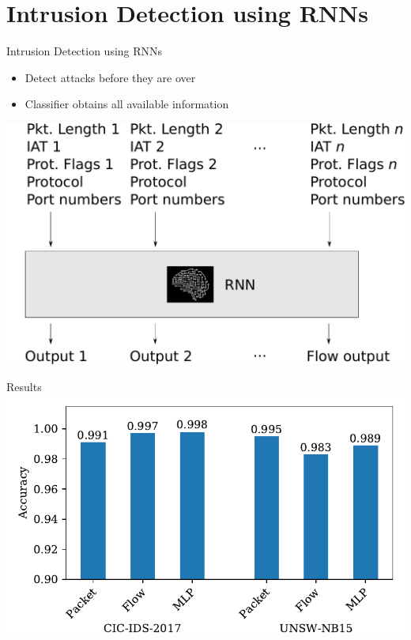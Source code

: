 \documentclass{beamer}
\begin{document}
\section{Intrusion Detection using RNNs}
\begin{frame}{Intrusion Detection using RNNs}
\begin{itemize}
\item Detect attacks before they are over
\item Classifier obtains all available information
\end{itemize}
\vspace{10pt}
\centering
\includegraphics[width=0.7\columnwidth]{figures/rnn.pdf}
\end{frame}


\begin{frame}{Results}
\includegraphics[width=\columnwidth]{figures/results.pdf}
\end{frame}
\end{document}
